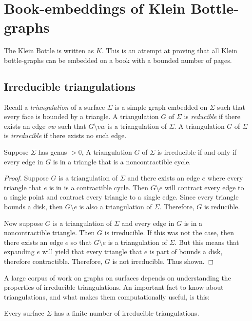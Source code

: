\section{Book-embeddings of Klein Bottle-graphs}
The Klein Bottle is written as $K$.
This is an attempt at proving that all Klein bottle-graphs can be embedded on a book with a bounded number of pages.

\subsection{Irreducible triangulations}
Recall a \textit{triangulation} of a surface $\Sigma$ is a simple graph embedded on $\Sigma$ such that every face is bounded by a triangle. A triangulation $G$ of $\Sigma$ is \textit{reducible} if there exists an edge $vw$ such that $G \setminus vw$ is a triangulation of $\Sigma$. A triangulation $G$ of $\Sigma$ is \textit{irreducible} if there exists no such edge. 

\begin{lemma}
    Suppose $\Sigma$ has genus $> 0$, A triangulation $G$ of $\Sigma$ is irreducible if and only if every edge in $G$ is in a triangle that is a noncontractible cycle.
\end{lemma}

\begin{proof}
    Suppose $G$ is a triangulation of $\Sigma$ and there exists an edge $e$ where every triangle that $e$ is in is a contractible cycle. Then $G \setminus e$ will contract every edge to a single point and contract every triangle to a single edge. Since every triangle bounds a disk, then $G \setminus e$ is also a triangulation of $\Sigma$. Therefore, $G$ is reducible. 

    Now suppose $G$ is a triangulation of $\Sigma$ and every edge in $G$ is in a noncontractible triangle. Then $G$ is irreducible. If this was not the case, then there exists an edge $e$ so that $G \setminus e$ is a triangulation of $\Sigma$. But this means that expanding $e$ will yield that every triangle that $e$ is part of bounds a disk, therefore contractible. Therefore, $G$ is not irreducible. Thus shown. 
\end{proof}

A large corpus of work on graphs on surfaces depends on understanding the properties of irreducible triangulations. An important fact to know about triangulations, and what makes them computationally useful, is this:

\begin{theorem}
    Every surface $\Sigma$ has a finite number of irreducible triangulations.
\end{theorem}

